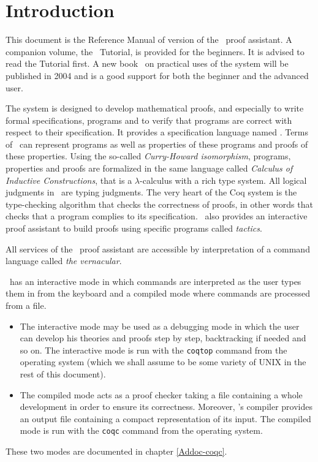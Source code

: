 \chapter*{Introduction}

This document is the Reference Manual of version \coqversion{} of the \Coq\ 
proof assistant. A companion volume, the \Coq\ Tutorial, is provided
for the beginners. It is advised to read the Tutorial first.
A new book~\cite{CoqArt} on practical uses of the \Coq{} system will
be published in 2004 and is a good support for both the beginner and
the advanced user.

The \Coq{} system is designed to develop mathematical proofs, and
especially to write formal specifications, programs and to verify that
programs are correct with respect to their specification. It provides
a specification language named \gallina. Terms of \gallina\ can
represent programs as well as properties of these programs and proofs
of these properties. Using the so-called \textit{Curry-Howard
  isomorphism}, programs, properties and proofs are formalized in the
same language called \textit{Calculus of Inductive Constructions},
that is a $\lambda$-calculus with a rich type system.  All logical
judgments in \Coq\ are typing judgments. The very heart of the Coq
system is the type-checking algorithm that checks the correctness of
proofs, in other words that checks that a program complies to its
specification. \Coq\ also provides an interactive proof assistant to
build proofs using specific programs called \textit{tactics}.

All services of the \Coq\ proof assistant are accessible by
interpretation of a command language called \textit{the vernacular}.

\Coq\ has an interactive mode in which commands are interpreted as the
user types them in from the keyboard and a compiled mode where
commands are processed from a file.  

\begin{itemize}
\item The interactive mode may be used as a debugging mode in which
  the user can develop his theories and proofs step by step,
  backtracking if needed and so on. The interactive mode is run with
  the {\tt coqtop} command from the operating system (which we shall
  assume to be some variety of UNIX in the rest of this document).
\item The compiled mode acts as a proof checker taking a file
  containing a whole development in order to ensure its correctness.
  Moreover, \Coq's compiler provides an output file containing a
  compact representation of its input. The compiled mode is run with
  the {\tt coqc} command from the operating system. 

\end{itemize}
These two modes are documented in chapter \ref{Addoc-coqc}.

